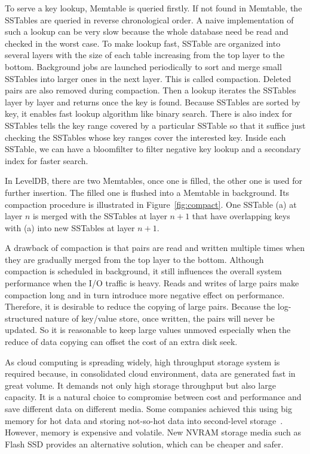 To serve a key lookup, Memtable is queried firstly. If not found in
Memtable, the SSTables are queried in reverse chronological order. A
naive implementation of such a lookup can be very slow because the
whole database need be read and checked in the worst case. To make
lookup fast, SSTable are organized into several layers with the size
of each table increasing from the top layer to the bottom. Background
jobs are launched periodically to sort and merge small SSTables into
larger ones in the next layer. This is called compaction. Deleted
pairs are also removed during compaction. Then a lookup iterates the
SSTables layer by layer and returns once the key is found.  Because
SSTables are sorted by key, it enables fast lookup algorithm like
binary search. There is also index for SSTables tells the key range
covered by a particular SSTable so that it suffice just checking the
SSTables whose key ranges cover the interested key. Inside each
SSTable, we can have a bloomfilter to filter negative key lookup and a
secondary index for faster search.

In LevelDB, there are two Memtables, once one is filled, the other one
is used for further insertion. The filled one is flushed into a
Memtable in background. Its compaction procedure is illustrated in
Figure~\ref{fig:compact}. One SSTable (a) at layer $n$ is merged with
the SSTables at layer $n+1$ that have overlapping keys with (a) into
new SSTables at layer $n+1$.

A drawback of compaction is that pairs are read and written multiple
times when they are gradually merged from the top layer to the bottom.
Although compaction is scheduled in background, it still influences
the overall system performance when the I/O traffic is heavy. Reads
and writes of large pairs make compaction long and in turn introduce
more negative effect on performance. Therefore, it is desirable to
reduce the copying of large pairs. Because the log-structured nature
of key/value store, once written, the pairs will never be updated. So
it is reasonable to keep large values unmoved especially when the
reduce of data copying can offset the cost of an extra disk seek.

As cloud computing is spreading widely, high throughput storage system
is required because, in consolidated cloud environment, data are
generated fast in great volume. It demands not only high storage
throughput but also large capacity. It is a natural choice to
compromise between cost and performance and save different data on
different media. Some companies achieved this using big memory for hot
data and storing not-so-hot data into second-level
storage~\cite{level_lifetime}.  However, memory is expensive and
volatile. New NVRAM storage media such as Flash SSD provides an
alternative solution, which can be cheaper and safer.

